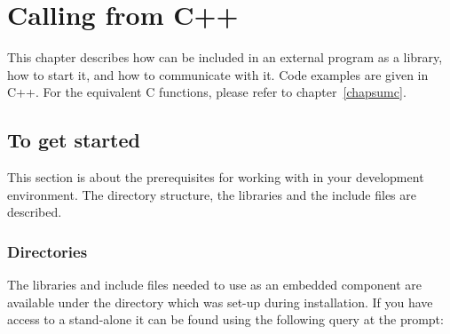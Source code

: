 %
% 
% 
% 
% 
%
%

%
%
\chapter{Calling {\eclipse} from  C++}
\label{chap1embed}

This chapter describes how {\eclipse} can be included in an external
program as a library, how to start it, and how to
communicate with it. Code examples are given in C++.
For the equivalent C functions, please refer to chapter~\ref{chapsumc}.

\section{To get started}

This section is about the prerequisites for working with
{\eclipse} in your development environment. The directory structure,
the libraries and the include files are described.

\subsection{Directories}

The libraries and include files needed to use {\eclipse} as an
embedded component are available under the {\eclipse}
directory which was set-up during installation. If you have access
to a stand-alone {\eclipse} it can be found using the following query
at the {\eclipse} prompt:


